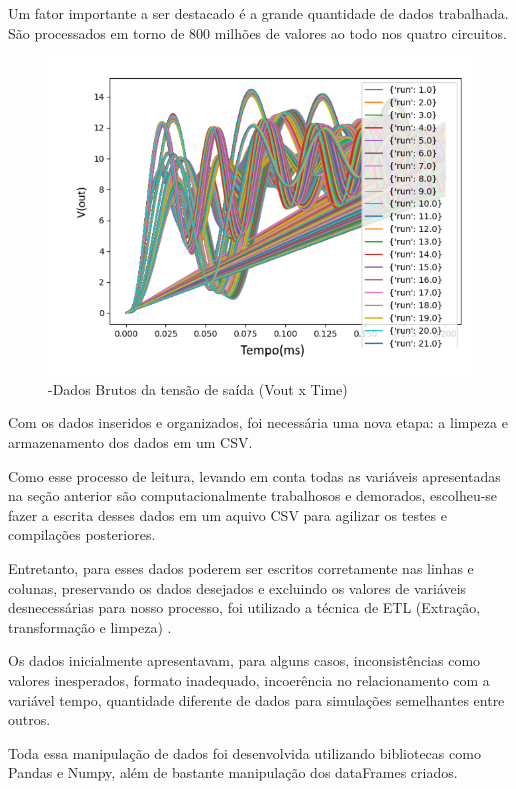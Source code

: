 Um fator importante a ser destacado é a grande quantidade de dados trabalhada. São processados em torno de 800 milhões de valores ao todo nos quatro circuitos. 


\begin{figure}[H]
\begin{center}
\includegraphics[width=15cm]{./04_Cap4/figures/DadosBrutosNONLinear.png}
\caption{\label{fig:SallenBruto}-Dados Brutos da tensão de saída (Vout x Time)}
\end{center}
\end{figure}


Com os dados inseridos e organizados, foi necessária uma nova etapa: a limpeza e armazenamento dos dados em um CSV. 

Como esse processo de leitura, levando em conta todas as variáveis apresentadas na seção anterior são computacionalmente trabalhosos e demorados, escolheu-se fazer a escrita desses dados em um aquivo CSV para agilizar os testes e compilações posteriores.

Entretanto, para esses dados poderem ser escritos corretamente nas linhas e colunas, preservando os dados desejados e excluindo os valores de variáveis desnecessárias para nosso processo, foi utilizado a técnica de ETL (Extração, transformação e limpeza) \cite{selecao}.

Os dados inicialmente apresentavam, para alguns casos, inconsistências como valores inesperados, formato inadequado, incoerência no relacionamento com a variável tempo, quantidade  diferente de dados para simulações semelhantes entre outros. 

Toda essa manipulação de dados foi desenvolvida utilizando bibliotecas como Pandas e  Numpy, além de bastante manipulação dos dataFrames criados. 

